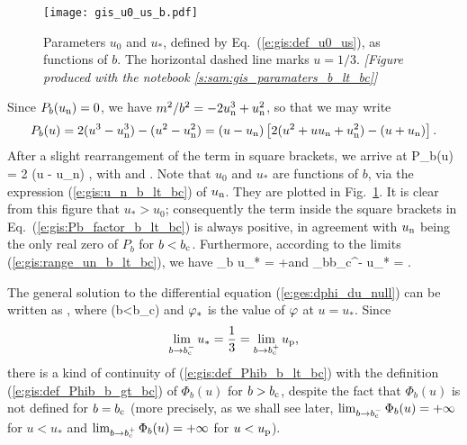 \begin{figure}
\centerline{\texttt{[image: gis\_u0\_us\_b.pdf]}}
\caption[]{\label{f:gis:u0_us_b} \footnotesize
Parameters $u_0$ and $u_*$, defined by Eq.~(\ref{e:gis:def_u0_us}), as functions
of $b$. The horizontal dashed line marks $u=1/3$.
\textsl{[Figure produced with the notebook \ref{s:sam:gis_paramaters_b_lt_bc}]}
}
\end{figure}


Since $P_b(u_{\rm n}) = 0$, we have $m^2/b^2 = - 2 u_{\rm n}^3 + u_{\rm n}^2$,
so that we may write
\[
    P_b(u) = 2 (u^3 - u_{\rm n}^3) - (u^2 - u_{\rm n}^2)
        = (u - u_{\rm n}) \left[ 2(u^2 + u u_{\rm n} + u_{\rm n}^2)
            - (u + u_{\rm n}) \right] .
\]
After a slight rearrangement of the term in square brackets, we arrive at
\be \label{e:gis:Pb_factor_b_lt_bc}
    P_b(u) = 2 (u - u_{\rm n}) \left[
        (u - u_0)^2 + (u_* - u_{\rm n})^2 - (u_0 - u_{\rm n})^2 \right] ,
\ee
with
\be \label{e:gis:def_u0_us}
    \qquad\mbox{and}\qquad
   .
\ee
Note that $u_0$ and $u_*$ are functions
of $b$, via the expression (\ref{e:gis:u_n_b_lt_bc}) of $u_{\rm n}$.
They are plotted in Fig.~\ref{f:gis:u0_us_b}. It is clear from this figure
that $u_* > u_0$; consequently the term inside the square brackets in
Eq.~(\ref{e:gis:Pb_factor_b_lt_bc}) is always positive, in agreement with
$u_{\rm n}$ being the only real
zero of $P_b$ for $b < b_{\rm c}$.
Furthermore, according to the limits (\ref{e:gis:range_un_b_lt_bc}), we have
\be \label{e:gis:lim_us}
    \lim_{b} u_* = +\infty \qquad\mbox{and}\qquad
    \lim_{b\to b_{\rm c}^-} u_* =  .
\ee

The general solution to the differential equation
(\ref{e:ges:dphi_du_null}) can be written as
\be \label{e:gis:ph_phs_Phib}
   ,
\ee
where
\be \label{e:gis:def_Phib_b_lt_bc}
     \quad (b<b_{\rm c})
\ee
and $\varphi_*$ is the value of $\varphi$ at $u=u_*$. Since
\[
    \lim_{b\to b_{\rm c}^-} u_* = \frac{1}{3} = \lim_{b\to b_{\rm c}^+} u_{\rm p},
\]
there is a kind of continuity of (\ref{e:gis:def_Phib_b_lt_bc})
with the definition (\ref{e:gis:def_Phib_b_gt_bc}) of $\Phi_b(u)$ for
$b>b_{\rm c}$, despite the fact that $\Phi_b(u)$ is not defined
for $b=b_{\rm c}$ (more precisely, as we shall see later,
$\lim_{b\to b_{\rm c}^-} \Phi_b(u) = + \infty$ for $u<u_*$ and
$\lim_{b\to b_{\rm c}^+} \Phi_b(u) = + \infty$ for $u<u_{\rm p}$).

